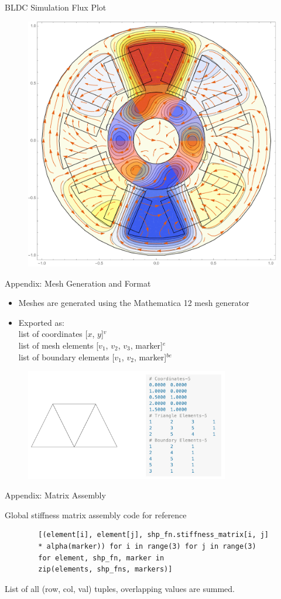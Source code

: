 \documentclass{beamer}
\begin{document}
    \begin{frame}{BLDC Simulation}
        Flux Plot
        \begin{figure}
            \includegraphics[width=.6\linewidth]{motor1.pdf}
        \end{figure}
    \end{frame}
    \begin{frame}{Appendix: Mesh Generation and Format}
        \begin{itemize}
            \item Meshes are generated using the Mathematica 12 mesh generator
            \item Exported as:\\ list of coordinates [$x$, $y$]$^v$ \\list of mesh elements [$v_1$, $v_2$, $v_3$, marker]$^{e}$ \\list of boundary elements [$v_1$, $v_2$, marker]$^{be}$
        \end{itemize}


        \begin{figure}
            \centering
            \includegraphics[width=3.5in]{meshdemo.png}
        \end{figure}
    \end{frame}
    \begin{frame}[fragile]{Appendix: Matrix Assembly}

        Global stiffness matrix assembly code for reference
        {\small
        \begin{verbatim}
        [(element[i], element[j], shp_fn.stiffness_matrix[i, j]
        * alpha(marker)) for i in range(3) for j in range(3)
        for element, shp_fn, marker in
        zip(elements, shp_fns, markers)]
        \end{verbatim}}
        List of all (row, col, val) tuples, overlapping values are summed.
    \end{frame}
\end{document}
